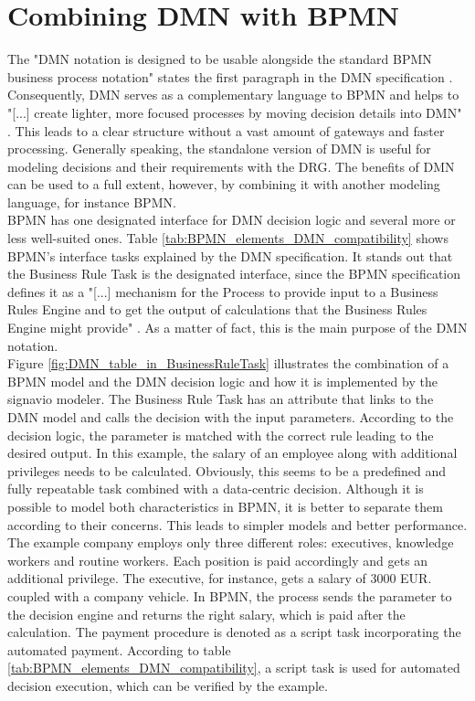 \section{Combining DMN with BPMN}
The "DMN notation is designed to be usable alongside the standard BPMN business process notation" states the first paragraph in the DMN specification \cite{DMNspec2016}. Consequently, DMN serves as a complementary language to BPMN and helps to "[...] create lighter, more focused processes by moving decision details into DMN" \cite{DMNmicroguide}. This leads to a clear structure without a vast amount of gateways and faster processing. Generally speaking, the standalone version of DMN is useful for modeling decisions and their requirements with the \ac{DRG}. The benefits of DMN can be used to a full extent, however, by combining it with another modeling language, for instance BPMN. \\
BPMN has one designated interface for DMN decision logic and several more or less well-suited ones. Table \ref{tab:BPMN_elements_DMN_compatibility} shows BPMN's interface tasks explained by the DMN specification. It stands out that the Business Rule Task is the designated interface, since the BPMN specification defines it as a "[...] mechanism for the Process to provide input to a Business Rules Engine and to get the output of calculations that the Business Rules Engine might provide" \cite{BPMNspec}. As a matter of fact, this is the main purpose of the DMN notation. \\
Figure \ref{fig:DMN_table_in_BusinessRuleTask} illustrates the combination of a BPMN model and the DMN decision logic and how it is implemented by the signavio modeler. The Business Rule Task has an attribute that links to the DMN model and calls the decision with the input parameters. According to the decision logic, the parameter is matched with the correct rule leading to the desired output. In this example, the salary of an employee along with additional privileges needs to be calculated. Obviously, this seems to be a predefined and fully repeatable task combined with a data-centric decision. Although it is possible to model both characteristics in BPMN, it is better to separate them according to their concerns. This leads to simpler models and better performance. \\
The example company employs only three different roles: executives, knowledge workers and routine workers. Each position is paid accordingly and gets an additional privilege. The executive, for instance, gets a salary of 3000 EUR. coupled with a company vehicle. In BPMN, the process sends the parameter to the decision engine and returns the right salary, which is paid after the calculation. The payment procedure is denoted as a script task incorporating the automated payment. According to table \ref{tab:BPMN_elements_DMN_compatibility}, a script task is used for automated decision execution, which can be verified by the example. 

